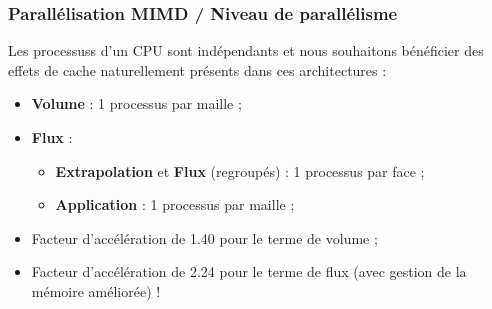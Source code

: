 \begin{frame}
\frametitle{Parallélisation MIMD / Niveau de parallélisme}
\vfill
Les processuss d'un CPU sont indépendants et nous souhaitons bénéficier des effets de cache
naturellement présents dans ces architectures :
\begin{itemize}
\item \textbf{Volume} : 1 processus par maille ;
\item \textbf{Flux} :
\begin{itemize}
\item \textbf{Extrapolation} et \textbf{Flux} (regroupés) : 1 processus par face ;
\item \textbf{Application} : 1 processus par maille ;
\end{itemize}
\item Facteur d'accélération de 1.40 pour le terme de volume ;
\item Facteur d'accélération de 2.24 pour le terme de flux (avec gestion de la mémoire améliorée) !
\end{itemize}
\vfill
\end{frame}

